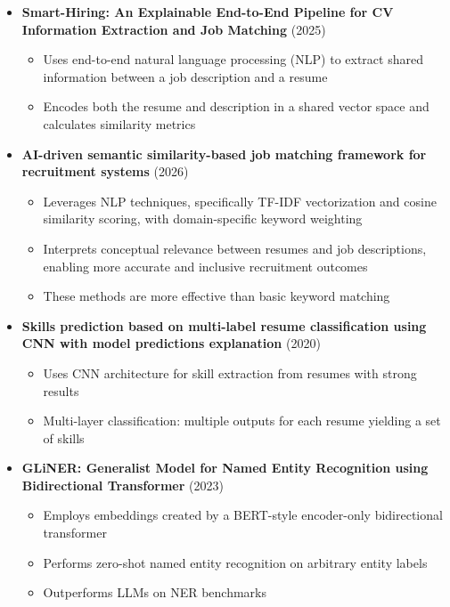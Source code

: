 \documentclass[12pt]{article}
\begin{document}
\begin{itemize}[leftmargin=1.5em]
    \item \textbf{Smart-Hiring: An Explainable End-to-End Pipeline for CV Information Extraction and Job Matching} \cite{smarthiring2025} (2025)
    \begin{itemize}
        \item Uses end-to-end natural language processing (NLP) to extract shared information between a job description and a resume
        \item Encodes both the resume and description in a shared vector space and calculates similarity metrics
    \end{itemize}

    \item \textbf{AI-driven semantic similarity-based job matching framework for recruitment systems} \cite{aidriven2026} (2026)
    \begin{itemize}
        \item Leverages NLP techniques, specifically TF-IDF vectorization and cosine similarity scoring, with domain-specific keyword weighting
        \item Interprets conceptual relevance between resumes and job descriptions, enabling more accurate and inclusive recruitment outcomes
        \item These methods are more effective than basic keyword matching
    \end{itemize}

    \item \textbf{Skills prediction based on multi-label resume classification using CNN with model predictions explanation} \cite{cnn2020} (2020)
    \begin{itemize}
        \item Uses CNN architecture for skill extraction from resumes with strong results
        \item Multi-layer classification: multiple outputs for each resume yielding a set of skills
    \end{itemize}

    \item \textbf{GLiNER: Generalist Model for Named Entity Recognition using Bidirectional Transformer} \cite{gliner2023} (2023)
    \begin{itemize}
        \item Employs embeddings created by a BERT-style encoder-only bidirectional transformer
        \item Performs zero-shot named entity recognition on arbitrary entity labels
        \item Outperforms LLMs on NER benchmarks
    \end{itemize}
\end{itemize}
\end{document}
